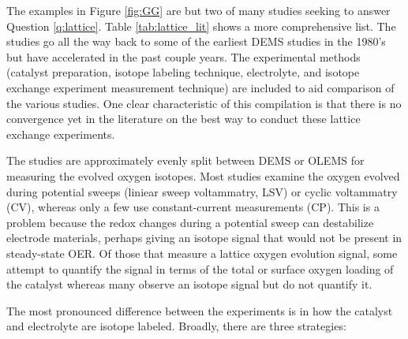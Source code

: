 

The examples in Figure \ref{fig:GG} are but two of many studies seeking to answer Question \ref{q:lattice}. Table \ref{tab:lattice_lit} shows a more comprehensive list. The studies go all the way back to some of the earliest DEMS studies in the 1980's but have accelerated in the past couple years. The experimental methods (catalyst preparation, isotope labeling technique, electrolyte, and isotope exchange experiment measurement technique) are included to aid comparison of the various studies. One clear characteristic of this compilation is that there is no convergence yet in the literature on the best way to conduct these lattice exchange experiments.

The studies are approximately evenly split between DEMS or OLEMS for measuring the evolved oxygen isotopes. Most studies examine the oxygen evolved during potential sweeps (liniear sweep voltammatry, LSV) or cyclic voltammatry (CV), whereas only a few use constant-current measurements (CP). This is a problem because the redox changes during a potential sweep can destabilize electrode materials\cite{Kasian2016, Cherevko2016}, perhaps giving an isotope signal that would not be present in steady-state OER. Of those that measure a lattice oxygen evolution signal, some attempt to quantify the signal in terms of the total or surface oxygen loading of the catalyst\cite{Fierro2007, Surendranath2010, Diaz-Morales2013, Amin2017} whereas many observe an isotope signal but do not quantify it\cite{Wohlfahrt-Mehrens1987, Grimaud2017, Geiger2018}. 

The most pronounced difference between the experiments is in how the catalyst and electrolyte are isotope labeled. Broadly, there are three strategies:

